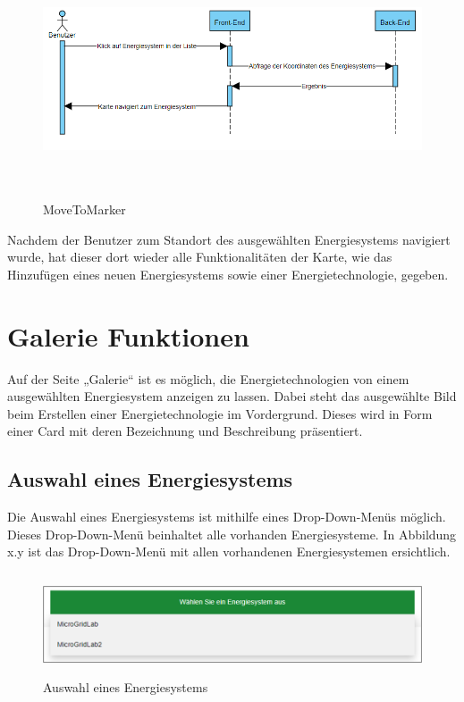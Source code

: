\begin{figure}[h]
	\centering
	\includegraphics[height=7cm,width=14cm]{images/MoveToMarker}
	\caption{MoveToMarker}
	\label{fig:Energiesystem auswählen }
\end{figure}

Nachdem der Benutzer zum Standort des ausgewählten Energiesystems navigiert wurde, hat dieser dort wieder alle Funktionalitäten der Karte, wie das Hinzufügen eines neuen Energiesystems sowie einer Energietechnologie, gegeben.


\newpage
\section{Galerie Funktionen}
Auf der Seite „Galerie“ ist es möglich, die Energietechnologien von einem ausgewählten Energiesystem anzeigen zu lassen. Dabei steht das ausgewählte Bild beim Erstellen einer Energietechnologie im Vordergrund. Dieses wird in Form einer Card mit deren Bezeichnung und Beschreibung präsentiert.


\subsection{Auswahl eines Energiesystems}
Die Auswahl eines Energiesystems ist mithilfe eines Drop-Down-Menüs möglich. Dieses Drop-Down-Menü beinhaltet alle vorhanden Energiesysteme. In Abbildung x.y ist das Drop-Down-Menü mit allen vorhandenen Energiesystemen ersichtlich.
\begin{figure}[h]
	\centering
	\includegraphics[height=3cm,width=14cm]{images/GalerieDropDown}
	\caption{Auswahl eines Energiesystems}
	\label{fig:Energiesystem auswählen }
\end{figure}


